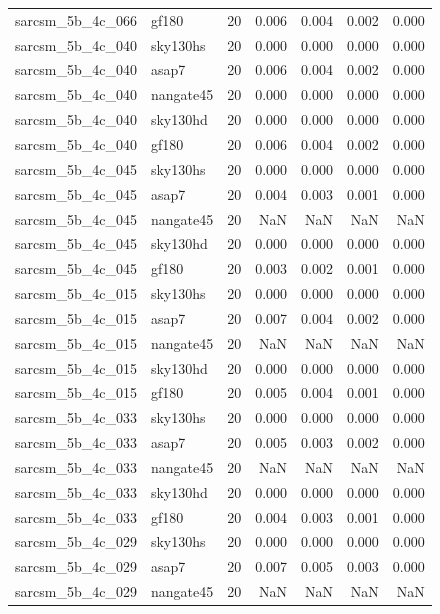 \begin{tabular}{llrrrrr}
sarcsm\_5b\_4c\_066 & gf180 & 20 & 0.006 & 0.004 & 0.002 & 0.000 \\
sarcsm\_5b\_4c\_040 & sky130hs & 20 & 0.000 & 0.000 & 0.000 & 0.000 \\
sarcsm\_5b\_4c\_040 & asap7 & 20 & 0.006 & 0.004 & 0.002 & 0.000 \\
sarcsm\_5b\_4c\_040 & nangate45 & 20 & 0.000 & 0.000 & 0.000 & 0.000 \\
sarcsm\_5b\_4c\_040 & sky130hd & 20 & 0.000 & 0.000 & 0.000 & 0.000 \\
sarcsm\_5b\_4c\_040 & gf180 & 20 & 0.006 & 0.004 & 0.002 & 0.000 \\
sarcsm\_5b\_4c\_045 & sky130hs & 20 & 0.000 & 0.000 & 0.000 & 0.000 \\
sarcsm\_5b\_4c\_045 & asap7 & 20 & 0.004 & 0.003 & 0.001 & 0.000 \\
sarcsm\_5b\_4c\_045 & nangate45 & 20 & NaN & NaN & NaN & NaN \\
sarcsm\_5b\_4c\_045 & sky130hd & 20 & 0.000 & 0.000 & 0.000 & 0.000 \\
sarcsm\_5b\_4c\_045 & gf180 & 20 & 0.003 & 0.002 & 0.001 & 0.000 \\
sarcsm\_5b\_4c\_015 & sky130hs & 20 & 0.000 & 0.000 & 0.000 & 0.000 \\
sarcsm\_5b\_4c\_015 & asap7 & 20 & 0.007 & 0.004 & 0.002 & 0.000 \\
sarcsm\_5b\_4c\_015 & nangate45 & 20 & NaN & NaN & NaN & NaN \\
sarcsm\_5b\_4c\_015 & sky130hd & 20 & 0.000 & 0.000 & 0.000 & 0.000 \\
sarcsm\_5b\_4c\_015 & gf180 & 20 & 0.005 & 0.004 & 0.001 & 0.000 \\
sarcsm\_5b\_4c\_033 & sky130hs & 20 & 0.000 & 0.000 & 0.000 & 0.000 \\
sarcsm\_5b\_4c\_033 & asap7 & 20 & 0.005 & 0.003 & 0.002 & 0.000 \\
sarcsm\_5b\_4c\_033 & nangate45 & 20 & NaN & NaN & NaN & NaN \\
sarcsm\_5b\_4c\_033 & sky130hd & 20 & 0.000 & 0.000 & 0.000 & 0.000 \\
sarcsm\_5b\_4c\_033 & gf180 & 20 & 0.004 & 0.003 & 0.001 & 0.000 \\
sarcsm\_5b\_4c\_029 & sky130hs & 20 & 0.000 & 0.000 & 0.000 & 0.000 \\
sarcsm\_5b\_4c\_029 & asap7 & 20 & 0.007 & 0.005 & 0.003 & 0.000 \\
sarcsm\_5b\_4c\_029 & nangate45 & 20 & NaN & NaN & NaN & NaN \\

\end{tabular}
